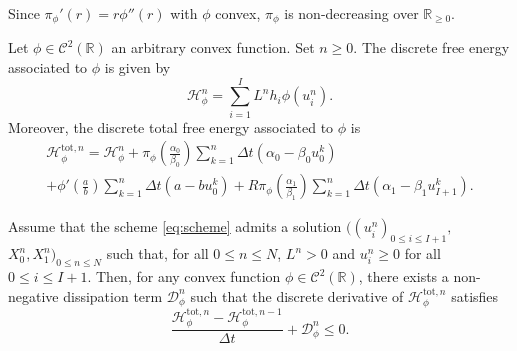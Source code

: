 \documentclass[10pt,a4paper]{amsart}
\newcommand\R{\mathbb{R}}
\newcommand\dt{\Delta t}
\renewcommand\H{\mathcal{H}_{\phi}}
\begin{document}
	\begin{remark} \label{rk:pi_croiss}
		Since $\pi_\phi'(r) = r \phi''(r)$ with $\phi$ convex, $\pi_\phi$ is non-decreasing over $\R_{\geq 0}$.
	\end{remark}

	\begin{definition}
		Let $\phi \in \mathcal{C}^2(\R)$ an arbitrary convex function. Set $n \geq 0$. The discrete free energy associated to $\phi$ is given by
		\begin{equation*}
			\H^n = \sum_{i=1}^I L^n h_i \phi(u_i^n).
		\end{equation*}
		Moreover, the discrete total free energy associated to $\phi$  is
		\begin{multline} \label{eq:def_htot_disc}
			\H^{{\text{tot}},n} = \H^n + \pi_\phi \left( \frac{\alpha_0}{\beta_0} \right) \sum_{k=1}^n \dt (\alpha_0 - \beta_0 u_0^k) \\
			+ \phi' \left(\frac{a}{b} \right) \sum_{k=1}^n \dt (a - b u_0^k) + R\pi_\phi \left( \frac{\alpha_1}{\beta_1} \right) \sum_{k=1}^n \dt (\alpha_1 - \beta_1 u_{I+1}^k).
		\end{multline}
	\end{definition}

	\begin{proposition} \label{prop:disc_energ_dec}
	    Assume that the scheme \eqref{eq:scheme} admits a solution $((u_i^n)_{0 \leq i \leq I+1},$ $X_0^n, X_1^n)_{0 \leq n \leq N} $ such that, for all $0\leq n\leq N$, $L^n>0$ and $u_i^n\geq 0 $ for all $0\leq i\leq I+1$.
		Then, for any convex function $\phi \in \mathcal{C}^2(\R)$, there exists a non-negative dissipation term $\mathcal{D}_{\phi}^n$ such that the discrete derivative of $\H^{{\text{tot}},n}$ satisfies
		\begin{equation} \label{eq:disc_htot_decr}
			\dfrac{\H^{{\text{tot}},n} - \H^{{\text{tot}},n-1}}{\dt} + \mathcal{D}_{\phi}^n \leq 0.
		\end{equation}
	\end{proposition}
\end{document}
